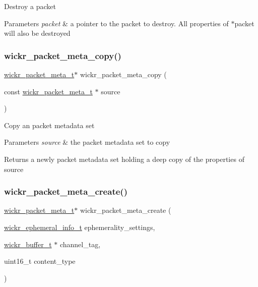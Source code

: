 Destroy a packet


\begin{DoxyParams}{Parameters}
{\em packet} & a pointer to the packet to destroy. All properties of \textquotesingle{}$\ast$packet\textquotesingle{} will also be destroyed \\
\hline
\end{DoxyParams}
\mbox{\label{group__wickr__protocol_ga1bb5a0f2a49069679b174b3e6521fe9b}} 
\subsubsection{\texorpdfstring{wickr\+\_\+packet\+\_\+meta\+\_\+copy()}{wickr\_packet\_meta\_copy()}}
{\footnotesize\ttfamily \mbox{\hyperlink{structwickr__packet__meta}{wickr\+\_\+packet\+\_\+meta\+\_\+t}}$\ast$ wickr\+\_\+packet\+\_\+meta\+\_\+copy (\begin{DoxyParamCaption}\item[{const \mbox{\hyperlink{structwickr__packet__meta}{wickr\+\_\+packet\+\_\+meta\+\_\+t}} $\ast$}]{source }\end{DoxyParamCaption})}

Copy an packet metadata set


\begin{DoxyParams}{Parameters}
{\em source} & the packet metadata set to copy \\
\hline
\end{DoxyParams}
\begin{DoxyReturn}{Returns}
a newly packet metadata set holding a deep copy of the properties of \textquotesingle{}source\textquotesingle{} 
\end{DoxyReturn}
\mbox{\label{group__wickr__protocol_ga146144d74da12c1fff766462fe7fa661}} 
\subsubsection{\texorpdfstring{wickr\+\_\+packet\+\_\+meta\+\_\+create()}{wickr\_packet\_meta\_create()}}
{\footnotesize\ttfamily \mbox{\hyperlink{structwickr__packet__meta}{wickr\+\_\+packet\+\_\+meta\+\_\+t}}$\ast$ wickr\+\_\+packet\+\_\+meta\+\_\+create (\begin{DoxyParamCaption}\item[{\mbox{\hyperlink{structwickr__ephemeral__info}{wickr\+\_\+ephemeral\+\_\+info\+\_\+t}}}]{ephemerality\+\_\+settings,  }\item[{\mbox{\hyperlink{structwickr__buffer}{wickr\+\_\+buffer\+\_\+t}} $\ast$}]{channel\+\_\+tag,  }\item[{uint16\+\_\+t}]{content\+\_\+type }\end{DoxyParamCaption})}

